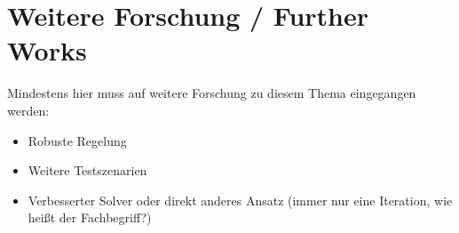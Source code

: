 \chapter{Weitere Forschung / Further Works} \label{ch_FurtherWorks}
Mindestens hier muss auf weitere Forschung zu diesem Thema eingegangen werden:

\begin{itemize}
    \item Robuste Regelung
    \item Weitere Testszenarien
    \item Verbesserter Solver oder direkt anderes Ansatz (immer nur eine Iteration, wie heißt der Fachbegriff?)
\end{itemize}